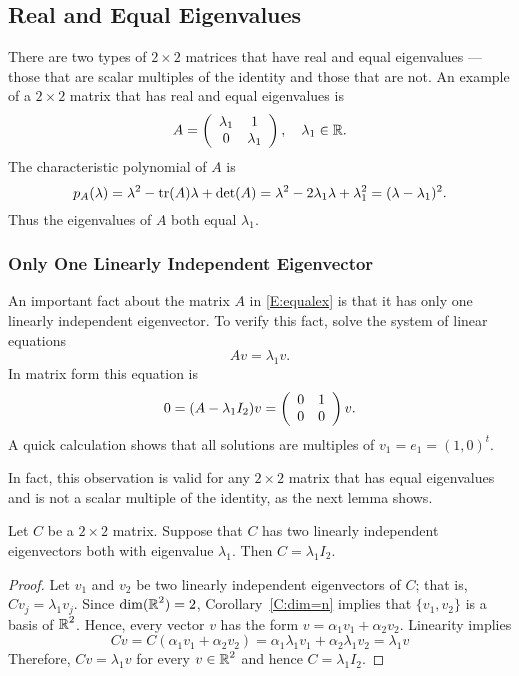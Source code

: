 \documentclass{ximera}
\begin{document}
\subsection*{Real and Equal Eigenvalues}

There are two types of $2\times 2$ matrices that have real and equal
eigenvalues --- those that are scalar multiples of the identity and those
that are not.  An example of a $2\times 2$ matrix that has real and equal
eigenvalues is
\begin{equation}  \label{E:equalex}
A = \left(\begin{array}{cc} \lambda_1 & 1\\ 0 &\lambda_1\end{array}\right), \quad \lambda_1\in\mbox{$\mathbb{R}$}.
\end{equation}
The characteristic polynomial of $A$ is
\[
p_A(\lambda) = \lambda^2 - {\rm tr}(A)\lambda + \det(A) =
\lambda^2 -2\lambda_1\lambda + \lambda_1^2 = (\lambda-\lambda_1)^2.
\]
Thus the eigenvalues of $A$ both equal $\lambda_1$.

\subsubsection*{Only One Linearly Independent Eigenvector}

An important fact about the matrix $A$ in \eqref{E:equalex} is that it has
only one linearly independent eigenvector.  To verify this fact, solve the
system of linear equations
\[
Av = \lambda_1v.
\]
In matrix form this equation is
\[
0 = (A-\lambda_1I_2)v = \left(\begin{array}{rr} 0 & 1\\ 0 &0\end{array}\right)v.
\]
A quick calculation shows that all solutions are multiples of
$v_1=e_1=(1,0)^t$.

In fact, this observation is valid for any $2\times 2$ matrix that has
equal eigenvalues and is not a scalar multiple of the identity, as the next
lemma shows.

\begin{lemma}  \label{L:1indeig}
Let $C$ be a $2\times 2$ matrix.  Suppose that $C$ has two linearly
independent eigenvectors both with eigenvalue $\lambda_1$.
Then $C = \lambda_1 I_2$.
\end{lemma}

\begin{proof}  Let $v_1$ and $v_2$ be two linearly independent
eigenvectors of $C$; that is, $Cv_j = \lambda_1 v_j$.  Since $\dim(\mbox{$\mathbb{R}$}^2) = 2$,
Corollary~\ref{C:dim=n} implies that $\{v_1,v_2\}$ is a basis of $\mbox{$\mathbb{R}$}^2$.  Hence,
every vector $v$ has the form $v = \alpha_1v_1+\alpha_2v_2$.  Linearity implies 
\[
Cv = C( \alpha_1v_1+\alpha_2v_2) = \alpha_1\lambda_1 v_1+\alpha_2\lambda_1 v_2 = \lambda_1v
\]
Therefore, $Cv = \lambda_1 v$ for every $v\in\mbox{$\mathbb{R}$}^2$ and hence $C= \lambda_1 I_2$.  
\end{proof}
\end{document}
